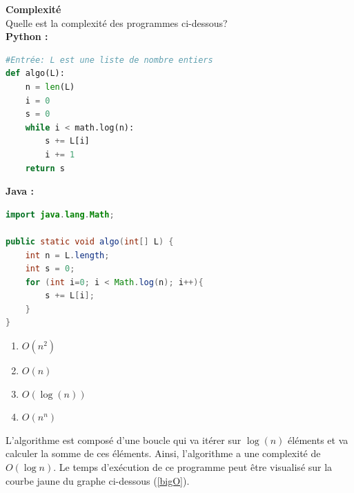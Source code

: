 \begin{Exercice}[10 minutes] \textbf{Complexité} \\
    Quelle est la complexité des programmes ci-dessous?\\
    \textbf{Python :}
    \begin{lstlisting}[language=Python]
#Entrée: L est une liste de nombre entiers
def algo(L):
    n = len(L)
    i = 0
    s = 0
    while i < math.log(n):
        s += L[i]
        i += 1
    return s
    \end{lstlisting}
    
    \textbf{Java :}
    \begin{lstlisting}[language=Java]
import java.lang.Math; 

public static void algo(int[] L) {
    int n = L.length;
    int s = 0;
    for (int i=0; i < Math.log(n); i++){
        s += L[i];
    }
} \end{lstlisting}

    \begin{enumerate}
        \item $O(n^2)$
        \item $O(n)$
        \item $O(\log(n))$
        \item $O(n^n)$
    \end{enumerate}

    \begin{solution}
    L'algorithme est composé d'une boucle qui va itérer sur $\log(n)$ éléments et 
    va calculer la somme de ces éléments. Ainsi, l'algorithme a une complexité de $O(\log n)$.
    Le temps d'exécution de ce programme peut être visualisé sur la courbe jaune du graphe ci-dessous (\ref{bigO}).
    \end{solution}    

\end{Exercice}

